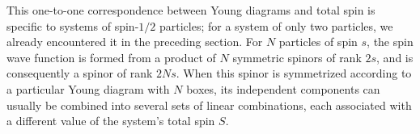 This one-to-one correspondence between Young diagrams and total spin is specific to systems of spin-$1/2$ particles; for a system of only two particles, we already encountered it in the preceding section. For $N$ particles of spin $s$, the spin wave function is formed from a product of $N$ symmetric spinors of rank $2s$, and is consequently a spinor of rank $2Ns$. When this spinor is symmetrized according to a particular Young diagram with $N$ boxes, its independent components can usually be combined into several sets of linear combinations, each associated with a different value of the system's total spin $S$.
